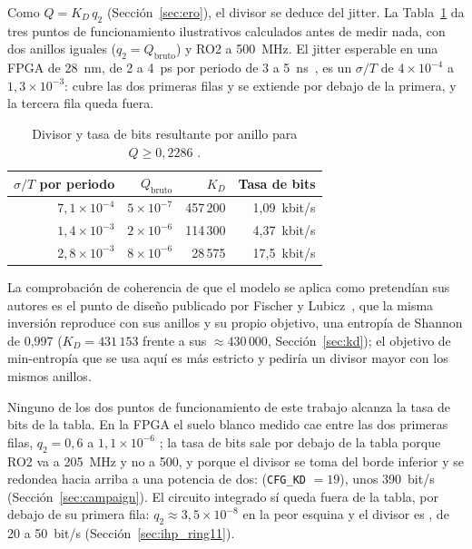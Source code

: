 Como $Q = K_D\,q_2$ (Sección~\ref{sec:ero}), el divisor se deduce del
jitter. La Tabla~\ref{tab:opoint} da tres puntos de funcionamiento
ilustrativos calculados antes de medir nada, con dos anillos iguales
($q_2 = Q_{\mathrm{bruto}}$) y RO2 a 500~MHz. El jitter esperable en una
\ac{FPGA} de 28~nm, de 2 a 4~ps por periodo de 3 a
5~ns~\cite{petura_2016_survey}, es un $\sigma/T$ de $4\times10^{-4}$ a
$1{,}3\times10^{-3}$: cubre las dos primeras filas y se extiende por
debajo de la primera, y la tercera fila queda fuera.

\begin{table}[htbp]
\centering
\caption{Divisor y tasa de bits resultante por anillo para
$Q \ge 0{,}2286$ \est{}.}
\label{tab:opoint}
\small
\begin{tabular}{@{}rrrr@{}}
\toprule
$\sigma/T$ por periodo & $Q_{\mathrm{bruto}}$ & $K_D$ & Tasa de bits \\
\midrule
$7{,}1\times10^{-4}$ & $5\times10^{-7}$ & 457\,200 & 1,09~kbit/s \\
$1{,}4\times10^{-3}$ & $2\times10^{-6}$ & 114\,300 & 4,37~kbit/s \\
$2{,}8\times10^{-3}$ & $8\times10^{-6}$ & 28\,575  & 17,5~kbit/s \\
\bottomrule
\end{tabular}
\end{table}

La comprobación de coherencia de que el modelo se aplica como pretendían
sus autores es el punto de diseño publicado por Fischer y
Lubicz~\cite{fischer_2014_embedded}, que la misma inversión reproduce con
sus anillos y su propio objetivo, una entropía de Shannon de 0,997
($K_D = 431\,153$ frente a sus $\approx 430\,000$,
Sección~\ref{sec:kd}); el objetivo de min-entropía que se usa aquí es más
estricto y pediría un divisor mayor con los mismos anillos.

Ninguno de los dos puntos de funcionamiento de este trabajo alcanza la
tasa de bits de la tabla. En la \ac{FPGA} el suelo blanco medido cae
entre las dos primeras filas, $q_2 = 0{,}6$ a $1{,}1\times10^{-6}$
\meas{}; la tasa de bits sale por debajo de la tabla porque RO2 va a
205~MHz y no a 500, y porque el divisor se toma del borde inferior y se
redondea hacia arriba a una potencia de dos: 
(\texttt{CFG\_KD} $= 19$), unos 390~bit/s
(Sección~\ref{sec:campaign}). El circuito integrado sí queda fuera de la
tabla, por debajo de su primera fila:
$q_2 \approx 3{,}5\times10^{-8}$ en la peor esquina y el divisor es
, de 20 a 50~bit/s \est{} (Sección~\ref{sec:ihp_ring11}).

